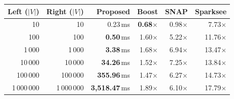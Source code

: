 \begin{table}[!t]
	\begin{adjustbox}{max width=\textwidth}
		\begin{minipage}[b]{\textwidth}
			\centering
			\begin{tabular}{@{}rr|r|rrr@{}}
				\toprule
				Left ($|V|$)  & Right ($|V|$)  & Proposed     & Boost                 & SNAP                  & Sparksee \\
				\midrule
				10 &10 &    0.23\,ms           & \textbf{0.68}$\times$ & 0.98$\times$ &  7.73$\times$\\
				100 &  100 &   \textbf{0.50}\,ms  & 1.60$\times$          & 5.22$\times$          & 11.76$\times$\\
				1\,000 &  1\,000 &  \textbf{3.38}\,ms  & 1.68$\times$          & 6.94$\times$          & 13.47$\times$\\
				10\,000 & 10\,000 &  \textbf{34.26}\,ms  & 1.52$\times$          & 7.25$\times$          & 13.84$\times$\\
				100\,000 & 100\,000 & \textbf{355.96}\,ms  & 1.47$\times$          & 6.27$\times$          & 14.73$\times$\\
				1\,000\,000 & 1\,000\,000 & \textbf{3,518.47}\,ms  & 1.89$\times$          & 6.10$\times$          & 17.79$\times$\\
				\bottomrule
			\end{tabular}
			\label{fig:sumsize}
		\end{minipage}
	\end{adjustbox}


\end{table}
